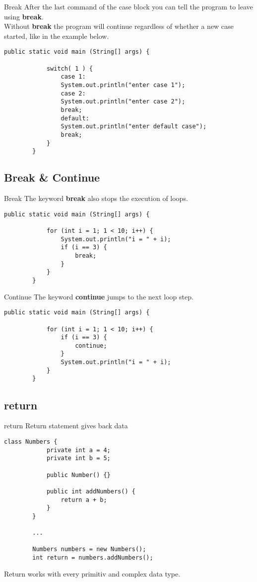 \begin{frame}[fragile]{Break}
	After the last command of the case block	you can tell the program to leave using \textbf{break}.\\
	Without \textbf{break} the program will continue regardless of
	whether a new case started, like in the example below.
	\begin{lstlisting}[basicstyle=\ttfamily\scriptsize]
		public static void main (String[] args) {
			
			switch( 1 ) {
				case 1:
				System.out.println("enter case 1");
				case 2:
				System.out.println("enter case 2");
				break;
				default:
				System.out.println("enter default case");
				break;
			}
		}
	\end{lstlisting}
\end{frame}

\subsection{Break \& Continue}
\begin{frame}[fragile]{Break}
	The keyword \textbf{break} also stops the execution of loops.
	\begin{lstlisting}[basicstyle=\ttfamily\scriptsize]
		public static void main (String[] args) {
			
			for (int i = 1; 1 < 10; i++) {
				System.out.println("i = " + i);
				if (i == 3) {
					break;
				}
			}
		}
	\end{lstlisting}
\end{frame}

\begin{frame}[fragile]{Continue}
	The keyword \textbf{continue} jumps to the next loop step.
	\begin{lstlisting}[basicstyle=\ttfamily\scriptsize]
		public static void main (String[] args) {
			
			for (int i = 1; 1 < 10; i++) {
				if (i == 3) {
					continue;
				}
				System.out.println("i = " + i);
			}
		}
	\end{lstlisting}
\end{frame}

\subsection{return}
\begin{frame}[fragile]{return}
	Return statement gives back data
	\begin{lstlisting}[basicstyle=\ttfamily\scriptsize]
		class Numbers {
			private int a = 4;
			private int b = 5;
			
			public Number() {}
			
			public int addNumbers() {
				return a + b;
			}
		}
		
		...
		
		Numbers numbers = new Numbers();
		int return = numbers.addNumbers();
	\end{lstlisting}
	
	Return works with every primitiv and complex data type.
	
\end{frame}

